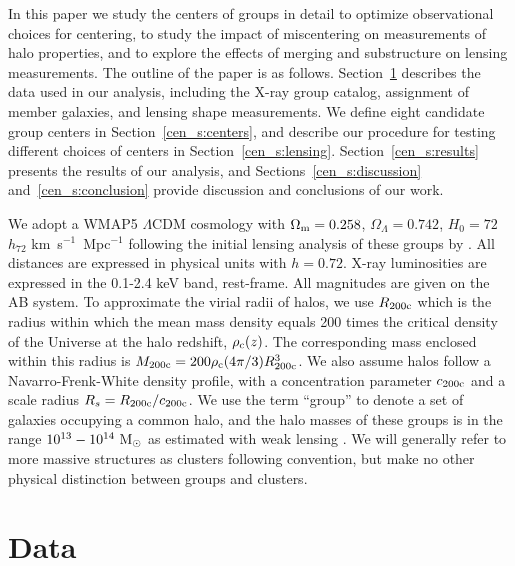 In this paper we study the centers of groups in
detail to optimize observational choices for centering, to study the
impact of miscentering on measurements of halo properties, and to
explore the effects of merging and substructure on lensing
measurements. The outline of the paper is as follows. Section~\ref{cen_s:data} describes the data used in our
analysis, including the X-ray group catalog, assignment of member galaxies,
and lensing shape measurements. We define eight candidate group
centers in Section~\ref{cen_s:centers}, and describe our procedure for
testing different choices of centers in Section~\ref{cen_s:lensing}. Section~\ref{cen_s:results}
presents the results of our analysis, and Sections~\ref{cen_s:discussion}
and~\ref{cen_s:conclusion} provide discussion and conclusions of our work.

We adopt a WMAP5 $\Lambda$CDM cosmology with $\Omega_{\rm m}=0.258$,
$\Omega_\Lambda=0.742$, $H_0=72$ $h_{72}$ km~s$^{-1}$~Mpc$^{-1}$
\citep{Dunkley2009} following the initial lensing analysis of these
groups by \citet{Leauthaud2010}. All distances are expressed in
physical units with $h=0.72$. X-ray luminosities are expressed in the 0.1-2.4 keV
band, rest-frame. All magnitudes are given on the AB system. To
approximate the virial radii of halos, we use $R_{\rm 200c}$ which is
the radius within which the mean mass density equals 200 times the
critical density of the Universe at the halo redshift, $\rho_{\rm
  c}(z)$. The corresponding mass enclosed within this radius is
$M_{\rm 200c}=200\rho_{\rm c}(4\pi/3)R_{\rm 200c}^3$. We also assume
halos follow a Navarro-Frenk-White \citep[NFW, ][]{Navarro1996} density
profile, with a concentration parameter $c_{\rm 200c}$ and a scale radius
$R_{s}=R_{\rm 200c}/c_{\rm 200c}$. We use the term ``group'' to 
denote a set of galaxies occupying a common halo, and the halo masses
of these groups is in the range $10^{13}-10^{14}~{\rm M_{\odot}}$ as
estimated with weak lensing \citep{Leauthaud2010}. We will generally
refer to more massive structures as clusters following convention, but
make no other physical distinction between groups and clusters.


\section{Data}
\label{cen_s:data}

